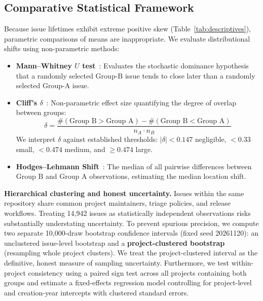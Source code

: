 \subsection{Comparative Statistical Framework}\label{sec:stats}
Because issue lifetimes exhibit extreme positive skew (Table~\ref{tab:descriptives}), parametric comparisons of means are inappropriate. We evaluate distributional shifts using non-parametric methods:
\begin{itemize}
  \item \textbf{Mann--Whitney $U$ test}~\cite{mann1947test}: Evaluates the stochastic dominance hypothesis that a randomly selected Group-B issue tends to close later than a randomly selected Group-A issue.
  \item \textbf{Cliff's $\delta$}~\cite{cliff1993dominance}: Non-parametric effect size quantifying the degree of overlap between groups:
    \begin{equation}
    \delta = \frac{\#(\text{Group B} > \text{Group A}) - \#(\text{Group B} < \text{Group A})}{n_A \cdot n_B}
    \end{equation}
    We interpret $\delta$ against established thresholds: $|\delta| < 0.147$ negligible, $<0.33$ small, $<0.474$ medium, and $\ge 0.474$ large.
  \item \textbf{Hodges--Lehmann Shift}~\cite{hodges1963estimates}: The median of all pairwise differences between Group B and Group A observations, estimating the median location shift.
\end{itemize}

\textbf{Hierarchical clustering and honest uncertainty.} Issues within the same repository share common project maintainers, triage policies, and release workflows. Treating 14{,}942 issues as statistically independent observations risks substantially understating uncertainty. To prevent spurious precision, we compute two separate 10{,}000-draw bootstrap confidence intervals (fixed seed 20261120): an unclustered issue-level bootstrap and a \textbf{project-clustered bootstrap} (resampling whole project clusters). We treat the project-clustered interval as the definitive, honest measure of sampling uncertainty. Furthermore, we test within-project consistency using a paired sign test across all projects containing both groups and estimate a fixed-effects regression model controlling for project-level and creation-year intercepts with clustered standard errors.

